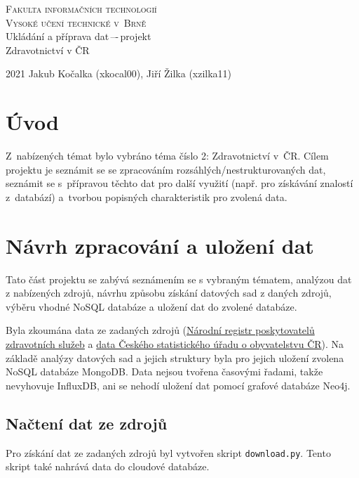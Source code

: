 \documentclass[11pt, a4paper]{article}
\title{}
\author{}
\date{}
\theoremstyle{definition}
\theoremstyle{plain}
\begin{document}
\begin{titlepage}
    \begin{center}
    \Huge
    \textsc{Fakulta informačních technologií \\[0.4em] Vysoké učení technické v~Brně}\\
    \LARGE Ukládání a příprava dat\,–-\,projekt\\[0.3em]
    Zdravotnictví v ČR\\
    \end{center}
    {\Large 2021 \hfill Jakub Kočalka (xkocal00), Jiří Žilka (xzilka11)}
\end{titlepage}

\section*{Úvod}

Z~nabízených témat bylo vybráno téma číslo 2: Zdravotnictví v~ČR. Cílem projektu je seznámit se se zpracováním rozsáhlých/nestrukturovaných dat, seznámit se s~přípravou těchto dat pro další využití (např. pro získávání znalostí z~databází) a~tvorbou popisných charakteristik pro zvolená data.

\section{Návrh zpracování a uložení dat}
Tato část projektu se zabývá seznámením se s vybraným tématem, analýzou dat z nabízených zdrojů, návrhu způsobu získání datových sad z daných zdrojů, výběru vhodné NoSQL databáze a uložení dat do zvolené databáze.

Byla zkoumána data ze zadaných zdrojů (\href{https://nrpzs.uzis.cz/index.php?pg=home--download&archiv=sluzby}{Národní registr poskytovatelů zdravotních služeb} a \href{https://www.czso.cz/csu/czso/obyvatelstvo-podle-petiletych-vekovych-skupin-a-pohlavi-v-krajich-a-okresech}{data Českého statistického úřadu o obyvatelstvu ČR}). Na základě analýzy datových sad a jejich struktury byla pro jejich uložení zvolena NoSQL databáze MongoDB. Data nejsou tvořena časovými řadami, takže nevyhovuje InfluxDB, ani se nehodí uložení dat pomocí grafové databáze Neo4j. 

\subsection{Načtení dat ze zdrojů}
Pro získání dat ze zadaných zdrojů byl vytvořen skript \texttt{download.py}. Tento skript také nahrává data do cloudové databáze. 
\end{document}
